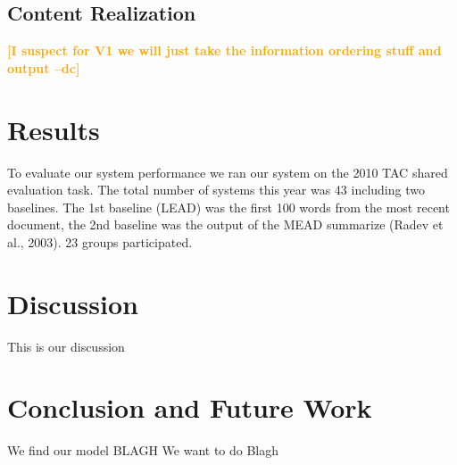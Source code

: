 \documentclass[11pt,a4paper]{article}
\newcommand{\spacemanidol}[1]{\textcolor{orange}{\bf \small [#1 --dc]}}
\begin{document}
\subsection{Content Realization}
\spacemanidol{I suspect for V1 we will just take the information ordering stuff and output}
\section{Results}
To evaluate our system performance we ran our system on the 2010 TAC shared evaluation task. 
The total number of systems this year was 43 including two baselines. The 1st baseline
(LEAD) was the first 100 words from the most recent document, the 2nd baseline was the
output of the MEAD summarize (Radev et al., 2003). 23 groups participated.
\section{Discussion}
This is our discussion
\section{Conclusion and Future Work}
We find our model BLAGH
We want to do Blagh


\end{document}

